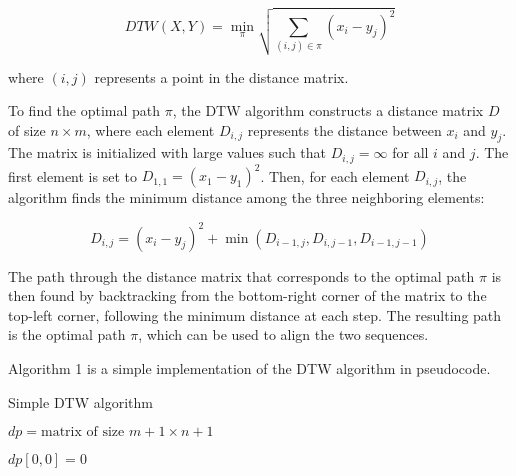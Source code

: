 \documentclass[final,rdr32.tex]{subfiles}
\begin{document}
\begin{equation}
    DTW(X,Y) = \min_{\pi}\sqrt{\sum_{(i,j) \in \pi}(x_i - y_j)^2}
\end{equation}

where $(i,j)$ represents a point in the distance matrix.

To find the optimal path $\pi$, the DTW algorithm constructs a distance matrix $D$ of size $n \times m$, where each element $D_{i,j}$ represents the distance between $x_i$ and $y_j$. The matrix is initialized with large values such that $D_{i,j} = \infty$ for all $i$ and $j$. The first element is set to $D_{1,1} = (x_1 - y_1)^2$. Then, for each element $D_{i,j}$, the algorithm finds the minimum distance among the three neighboring elements:

\begin{equation}
    D_{i,j} = (x_i - y_j)^2 + \min(D_{i-1,j}, D_{i,j-1}, D_{i-1,j-1})
\end{equation}

The path through the distance matrix that corresponds to the optimal path $\pi$ is then found by backtracking from the bottom-right corner of the matrix to the top-left corner, following the minimum distance at each step. The resulting path is the optimal path $\pi$, which can be used to align the two sequences.

\newpage

Algorithm 1 is a simple implementation of the DTW algorithm in pseudocode.

\begin{algorithm}
    \caption{Simple DTW algorithm}


    $dp = \text{matrix of size } m+1 \times n+1$

    $dp[0,0] = 0$


\end{algorithm}
\end{document}

